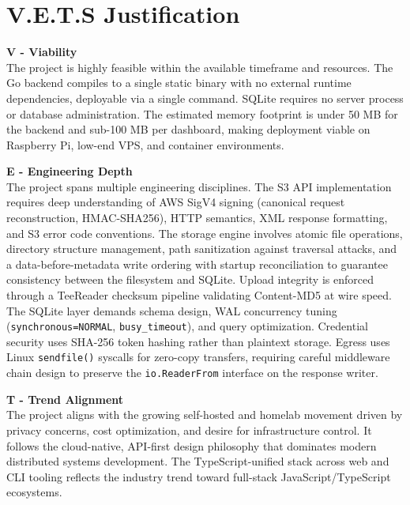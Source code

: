 \documentclass[12pt,a4paper]{report}
\begin{document}
\section{V.E.T.S Justification}

\vspace{0.3cm}
\noindent \textbf{V - Viability}\\
The project is highly feasible within the available timeframe and resources. The Go backend compiles to a single static binary with no external runtime dependencies, deployable via a single command. SQLite requires no server process or database administration. The estimated memory footprint is under 50 MB for the backend and sub-100 MB per dashboard, making deployment viable on Raspberry Pi, low-end VPS, and container environments.

\vspace{0.5cm}
\noindent \textbf{E - Engineering Depth}\\
The project spans multiple engineering disciplines. The S3 API implementation requires deep understanding of AWS SigV4 signing (canonical request reconstruction, HMAC-SHA256), HTTP semantics, XML response formatting, and S3 error code conventions. The storage engine involves atomic file operations, directory structure management, path sanitization against traversal attacks, and a data-before-metadata write ordering with startup reconciliation to guarantee consistency between the filesystem and SQLite. Upload integrity is enforced through a TeeReader checksum pipeline validating Content-MD5 at wire speed. The SQLite layer demands schema design, WAL concurrency tuning (\texttt{synchronous=NORMAL}, \texttt{busy\_timeout}), and query optimization. Credential security uses SHA-256 token hashing rather than plaintext storage. Egress uses Linux \texttt{sendfile()} syscalls for zero-copy transfers, requiring careful middleware chain design to preserve the \texttt{io.ReaderFrom} interface on the response writer.

\vspace{0.5cm}
\noindent \textbf{T - Trend Alignment}\\
The project aligns with the growing self-hosted and homelab movement driven by privacy concerns, cost optimization, and desire for infrastructure control. It follows the cloud-native, API-first design philosophy that dominates modern distributed systems development. The TypeScript-unified stack across web and CLI tooling reflects the industry trend toward full-stack JavaScript/TypeScript ecosystems.
\end{document}
